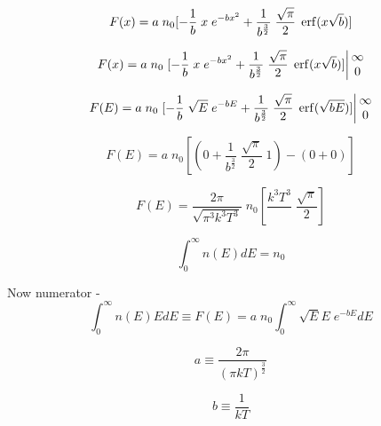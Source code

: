 \documentclass[11pt,a4paper]{article}
\begin{document}
\begin{equation}
    F(x) = a \; n_0 [-\frac{1}{b} \; x \; e^{-bx^2} + \frac{1}{b^{\frac{3}{2}}} \; \frac{\sqrt{\pi}}{2} \; \erf(x\sqrt{b})]
\end{equation}

\begin{equation}
    F(x) = a \; n_0 \left.[-\frac{1}{b} \; x \; e^{-bx^2} + \frac{1}{b^{\frac{3}{2}}} \; \frac{\sqrt{\pi}}{2} \; \erf(x\sqrt{b})]\right\vert \begin{matrix} \infty \\ 0 \end{matrix}
\end{equation}

\begin{equation}
    F(E) = a \; n_0 \left.[-\frac{1}{b} \; \sqrt{E} \; e^{-bE} + \frac{1}{b^{\frac{3}{2}}} \; \frac{\sqrt{\pi}}{2} \; \erf(\sqrt{bE})]\right\vert \begin{matrix} \infty \\ 0 \end{matrix}
\end{equation}

\begin{equation}
    F(E) = a \; n_0 [(0 + \frac{1}{b^{\frac{3}{2}}} \; \frac{\sqrt{\pi}}{2} \; 1) - (0 + 0)]
\end{equation}

\begin{equation}
    F(E) = \frac{2\pi}{\sqrt{\pi^3 k^3 T^3}} \; n_0 [\frac{k^3 T^3}{} \; \frac{\sqrt{\pi}}{2}]
\end{equation}

\vspace{\baselineskip}

\begin{equation}
    \int_0^{\infty} n(E)dE = n_0
\end{equation}

\newpage

\noindent Now numerator - 
\begin{equation}
    \int_0^{\infty} n(E) E dE \equiv F(E) = a \; n_0 \int_0^{\infty} \sqrt{E} E \; e^{-b E} dE 
\end{equation}

\begin{equation*}
    a \equiv \frac{2\pi}{(\pi kT)^{\frac{3}{2}}} 
\end{equation*}

\begin{equation*}
    b \equiv \frac{1}{kT}
\end{equation*}
\end{document}
